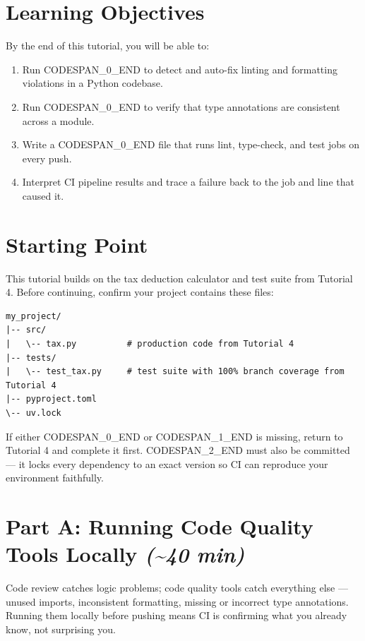 \documentclass[11pt,a4paper]{book}
\begin{document}
\medskip

\section{Learning Objectives}

By the end of this tutorial, you will be able to:

\begin{enumerate}
  \item Run CODESPAN\_0\_END to detect and auto-fix linting and formatting violations in a Python codebase.
  \item Run CODESPAN\_0\_END to verify that type annotations are consistent across a module.
  \item Write a CODESPAN\_0\_END file that runs lint, type-check, and test jobs on every push.
  \item Interpret CI pipeline results and trace a failure back to the job and line that caused it.
\end{enumerate}

\medskip

\section{Starting Point}

This tutorial builds on the tax deduction calculator and test suite from Tutorial 4. Before continuing, confirm your project contains these files:

\begin{lstlisting}
my_project/
|-- src/
|   \-- tax.py          # production code from Tutorial 4
|-- tests/
|   \-- test_tax.py     # test suite with 100% branch coverage from Tutorial 4
|-- pyproject.toml
\-- uv.lock
\end{lstlisting}

If either CODESPAN\_0\_END or CODESPAN\_1\_END is missing, return to Tutorial 4 and complete it first. CODESPAN\_2\_END must also be committed --- it locks every dependency to an exact version so CI can reproduce your environment faithfully.

\medskip

\section{Part A: Running Code Quality Tools Locally \textit{(\textasciitilde{}40 min)}}

Code review catches logic problems; code quality tools catch everything else --- unused imports, inconsistent formatting, missing or incorrect type annotations. Running them locally before pushing means CI is confirming what you already know, not surprising you.
\end{document}
